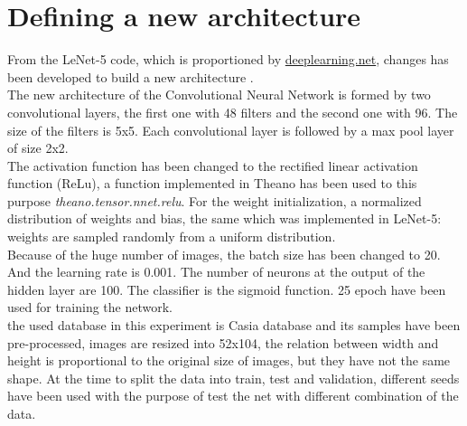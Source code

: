 \section{Defining a new architecture}
From the LeNet-5 code, which is proportioned by \url{deeplearning.net}, changes has been developed to build a new architecture \cite{LSTM-CNN}. \\


The new architecture of the Convolutional Neural Network is formed by two convolutional layers, the first one with 48 filters and the second one with 96. The size of the filters is 5x5. Each convolutional layer is followed by a max pool layer of size 2x2.\\

The activation function has been changed to the rectified linear activation function (ReLu), a function implemented in Theano has been used to this purpose \textit{theano.tensor.nnet.relu}. For the weight initialization, a normalized distribution of weights and bias, the same which was implemented in LeNet-5: weights are sampled randomly from a uniform distribution.\\

Because of the huge number of images, the  batch size has been changed to 20. And the learning rate is 0.001. The number of neurons at the output of the hidden layer are 100. The classifier is the sigmoid function. 25 epoch have been used for training the network.\\

the used database in this experiment is Casia database and its samples have been pre-processed, images are resized into 52x104, the relation between width and height is proportional to the original size of images, but they have not the same shape. At the time to split the data into train, test and validation, different seeds have been used with the purpose of test the net with different combination of the data.\\



